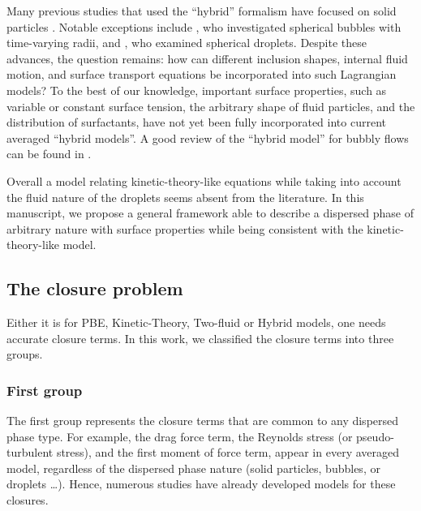 Many previous studies that used the ``hybrid'' formalism have focused on solid particles \citep{buyevich1979flow,jackson1997locally}. 
Notable exceptions include \citet{zhang1994ensemble}, who investigated spherical bubbles with time-varying radii, and \citet{zhang1997momentum}, who examined spherical droplets. 
Despite these advances, the question remains: how can different inclusion shapes, internal fluid motion, and surface transport equations be incorporated into such Lagrangian models? 
To the best of our knowledge, important surface properties, such as variable or constant surface tension, the arbitrary shape of fluid particles, and the distribution of surfactants, have not yet been fully incorporated into current averaged ``hybrid models''.  
A good review of the ``hybrid model'' for bubbly flows can be found in \citet{paisant2014modelisation,morel2015mathematical}. 

Overall a model relating kinetic-theory-like equations while taking into account the fluid nature of the droplets seems absent from the literature. 
In this manuscript, we propose a general framework able to describe a dispersed phase of arbitrary nature with surface properties while being consistent with the kinetic-theory-like model.

\subsection{The closure problem}

Either it is for PBE, Kinetic-Theory, Two-fluid or Hybrid  models, one needs accurate closure terms. 
In this work, we classified the closure terms into three groups. 


\subsubsection{First group}
The first group represents the closure terms that are common to any dispersed phase type. 
For example, the drag force term, the Reynolds stress (or pseudo-turbulent stress), and the first moment of force term, appear in every averaged model, regardless of the dispersed phase nature (solid particles, bubbles, or droplets \ldots). 
Hence, numerous studies have already developed models for these closures. 

